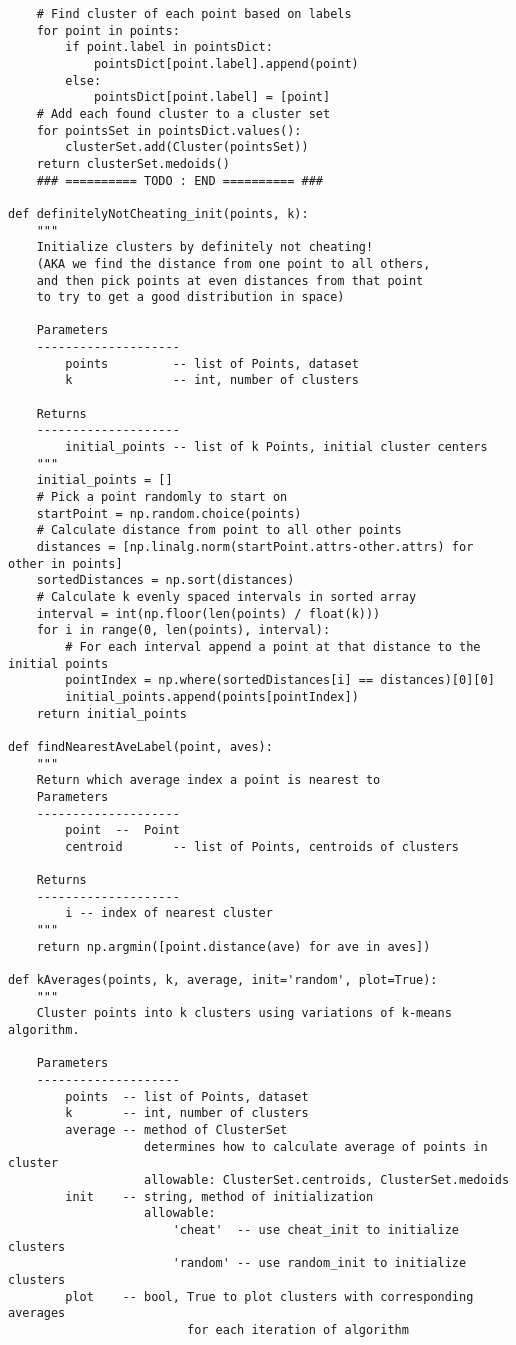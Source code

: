 \documentclass[11pt]{article}
\begin{document}
\begin{verbatim}
    # Find cluster of each point based on labels
    for point in points:
        if point.label in pointsDict:
            pointsDict[point.label].append(point)
        else:
            pointsDict[point.label] = [point]
    # Add each found cluster to a cluster set
    for pointsSet in pointsDict.values():
        clusterSet.add(Cluster(pointsSet))
    return clusterSet.medoids()
    ### ========== TODO : END ========== ###

def definitelyNotCheating_init(points, k):
    """
    Initialize clusters by definitely not cheating!
    (AKA we find the distance from one point to all others,
    and then pick points at even distances from that point
    to try to get a good distribution in space)
    
    Parameters
    --------------------
        points         -- list of Points, dataset
        k              -- int, number of clusters
    
    Returns
    --------------------
        initial_points -- list of k Points, initial cluster centers
    """
    initial_points = []
    # Pick a point randomly to start on
    startPoint = np.random.choice(points)
    # Calculate distance from point to all other points
    distances = [np.linalg.norm(startPoint.attrs-other.attrs) for other in points]
    sortedDistances = np.sort(distances)
    # Calculate k evenly spaced intervals in sorted array
    interval = int(np.floor(len(points) / float(k)))
    for i in range(0, len(points), interval):
        # For each interval append a point at that distance to the initial points
        pointIndex = np.where(sortedDistances[i] == distances)[0][0]
        initial_points.append(points[pointIndex])
    return initial_points

def findNearestAveLabel(point, aves):
    """
    Return which average index a point is nearest to
    Parameters
    --------------------
        point  --  Point
        centroid       -- list of Points, centroids of clusters
    
    Returns
    --------------------
        i -- index of nearest cluster
    """
    return np.argmin([point.distance(ave) for ave in aves])

def kAverages(points, k, average, init='random', plot=True):
    """
    Cluster points into k clusters using variations of k-means algorithm.
    
    Parameters
    --------------------
        points  -- list of Points, dataset
        k       -- int, number of clusters
        average -- method of ClusterSet
                   determines how to calculate average of points in cluster
                   allowable: ClusterSet.centroids, ClusterSet.medoids
        init    -- string, method of initialization
                   allowable: 
                       'cheat'  -- use cheat_init to initialize clusters
                       'random' -- use random_init to initialize clusters
        plot    -- bool, True to plot clusters with corresponding averages
                         for each iteration of algorithm
    

\end{verbatim}
\end{document}
